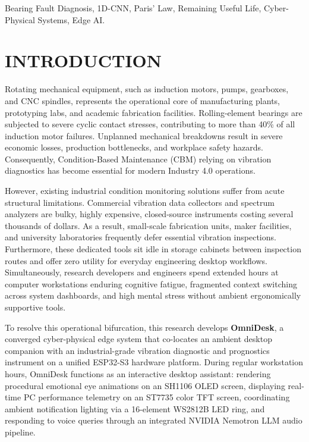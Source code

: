 \documentclass[10pt,journal,onecolumn]{IEEEtran}
\begin{document}
\begin{IEEEkeywords}
Bearing Fault Diagnosis, 1D-CNN, Paris' Law, Remaining Useful Life, Cyber-Physical Systems, Edge AI.
\end{IEEEkeywords}

\section{INTRODUCTION}
Rotating mechanical equipment, such as induction motors, pumps, gearboxes, and CNC spindles, represents the operational core of manufacturing plants, prototyping labs, and academic fabrication facilities. Rolling-element bearings are subjected to severe cyclic contact stresses, contributing to more than 40\% of all induction motor failures. Unplanned mechanical breakdowns result in severe economic losses, production bottlenecks, and workplace safety hazards. Consequently, Condition-Based Maintenance (CBM) relying on vibration diagnostics has become essential for modern Industry 4.0 operations.

However, existing industrial condition monitoring solutions suffer from acute structural limitations. Commercial vibration data collectors and spectrum analyzers are bulky, highly expensive, closed-source instruments costing several thousands of dollars. As a result, small-scale fabrication units, maker facilities, and university laboratories frequently defer essential vibration inspections. Furthermore, these dedicated tools sit idle in storage cabinets between inspection routes and offer zero utility for everyday engineering desktop workflows. Simultaneously, research developers and engineers spend extended hours at computer workstations enduring cognitive fatigue, fragmented context switching across system dashboards, and high mental stress without ambient ergonomically supportive tools.

To resolve this operational bifurcation, this research develops \textbf{OmniDesk}, a converged cyber-physical edge system that co-locates an ambient desktop companion with an industrial-grade vibration diagnostic and prognostics instrument on a unified ESP32-S3 hardware platform. During regular workstation hours, OmniDesk functions as an interactive desktop assistant: rendering procedural emotional eye animations on an SH1106 OLED screen, displaying real-time PC performance telemetry on an ST7735 color TFT screen, coordinating ambient notification lighting via a 16-element WS2812B LED ring, and responding to voice queries through an integrated NVIDIA Nemotron LLM audio pipeline.
\end{document}
